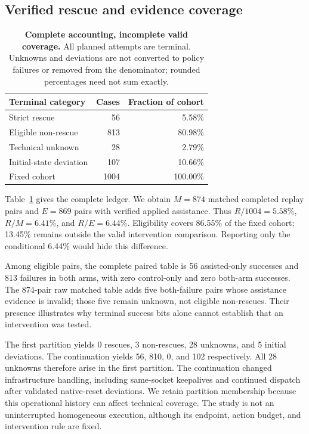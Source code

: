 \documentclass[10pt,twocolumn,letterpaper]{article}
\begin{document}
\subsection{Verified rescue and evidence coverage}
\begin{table}[t]
\centering\small
\begin{tabular}{@{}lrr@{}}
\toprule
Terminal category & Cases & Fraction of cohort\\
\midrule
Strict rescue &56&5.58\%\\
Eligible non-rescue &813&80.98\%\\
Technical unknown &28&2.79\%\\
Initial-state deviation &107&10.66\%\\
\midrule
Fixed cohort &1004&100.00\%\\
\bottomrule
\end{tabular}
\caption{\textbf{Complete accounting, incomplete valid coverage.} All planned attempts are terminal. Unknowns and deviations are not converted to policy failures or removed from the denominator; rounded percentages need not sum exactly.}
\label{tab:coverage}
\end{table}
Table~\ref{tab:coverage} gives the complete ledger. We obtain $M=874$ matched completed replay pairs and $E=869$ pairs with verified applied assistance. Thus $R/1004=5.58\%$, $R/M=6.41\%$, and $R/E=6.44\%$. Eligibility covers 86.55\% of the fixed cohort; 13.45\% remains outside the valid intervention comparison. Reporting only the conditional 6.44\% would hide this difference.

Among eligible pairs, the complete paired table is 56 assisted-only successes and 813 failures in both arms, with zero control-only and zero both-arm successes. The 874-pair raw matched table adds five both-failure pairs whose assistance evidence is invalid; those five remain unknown, not eligible non-rescues. Their presence illustrates why terminal success bits alone cannot establish that an intervention was tested.

The first partition yields 0 rescues, 3 non-rescues, 28 unknowns, and 5 initial deviations. The continuation yields 56, 810, 0, and 102 respectively. All 28 unknowns therefore arise in the first partition. The continuation changed infrastructure handling, including same-socket keepalives and continued dispatch after validated native-reset deviations. We retain partition membership because this operational history can affect technical coverage. The study is not an uninterrupted homogeneous execution, although its endpoint, action budget, and intervention rule are fixed.
\end{document}
